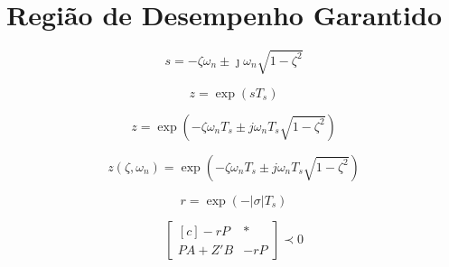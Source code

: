 \chapter{Região de Desempenho Garantido}

\begin{equation}
  s = -\zeta\omega_n \pm \jmath\omega_n \sqrt {1-\zeta^2} \label{eq:PontoPlanoS}
\end{equation}

\begin{equation}
  z = \exp(sT_s)\label{eq:TransformacaoSZ}
\end{equation}

\begin{equation}
  z = \exp{\left(-\zeta\omega_nT_s \pm j\omega_nT_s\sqrt{1-\zeta^2}\right)}\label{eq:PontoPlanoZ}
\end{equation}

\begin{equation}
  z(\zeta,\omega_n) = \exp{\left(-\zeta\omega_nT_s \pm j\omega_nT_s\sqrt{1-\zeta^2}\right)}\label{eq:FuncaoPontoZ}
\end{equation}

\begin{equation}
  r = \exp{\left(-|\sigma|T_s\right)}\label{eq:RaioEstabilidadeRelativa}
\end{equation}

\begin{figure}
  \centering
  
\end{figure}

\begin{figure}
  \centering
  
\end{figure}

\begin{figure}
  \centering
  
\end{figure}

\begin{figure}
  \centering
  
\end{figure}

\begin{figure}
  \centering
  
\end{figure}

\begin{figure}
  \centering
  
\end{figure}

\begin{equation}
  \begin{bmatrix*}[c]
    -rP       & * \\
    PA + Z'B  & -rP
  \end{bmatrix*}
  \prec 0\label{eq:LMIEstabilidadeRelativa}
\end{equation}

